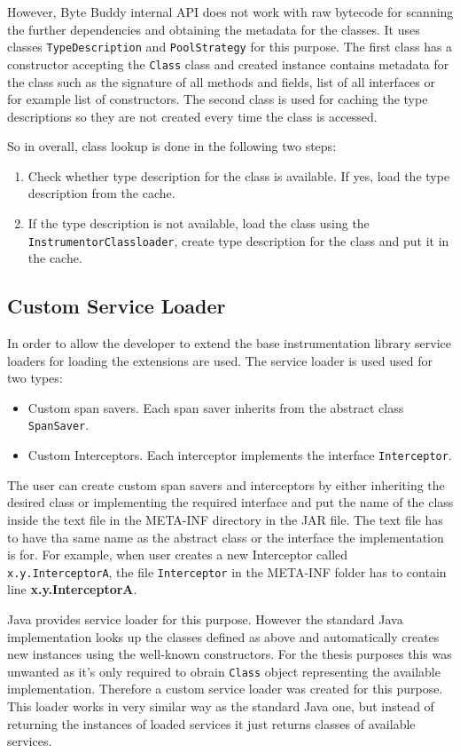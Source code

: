 However, Byte Buddy internal API does not work with raw bytecode for scanning the further dependencies and obtaining the metadata for the classes. It uses classes \texttt{TypeDescription} and \texttt{PoolStrategy} for this purpose. The first class has a constructor accepting the \texttt{Class} class and created instance contains metadata for the class such as the signature of all methods and fields, list of all interfaces or for example list of constructors. The second class is used for caching the type descriptions so they are not created every time the class is accessed. 

So in overall, class lookup is done in the following two steps:
\begin{enumerate}
	\item Check whether type description for the class is available. If yes, load the type description from the cache.
	\item If the type description is not available, load the class using the \newline \texttt{InstrumentorClassloader}, create type description for the class and put it in the cache.
\end{enumerate}

\subsection{Custom Service Loader}
In order to allow the developer to extend the base instrumentation library service loaders for loading the extensions are used. The service loader is used used for two types: 
\begin{itemize}
	\item Custom span savers. Each span saver inherits from the abstract class \texttt{SpanSaver}.
	\item Custom Interceptors. Each interceptor implements the interface \texttt{Interceptor}.
\end{itemize} 
The user can create custom span savers and interceptors by either inheriting the desired class or implementing the required interface and put the name of the class inside the text file in the META-INF directory in the JAR file. The text file has to have tha same name as the abstract class or the interface the implementation is for. For example, when user creates a new Interceptor called \texttt{x.y.InterceptorA}, the file \texttt{Interceptor} in the META-INF folder has to contain line \textbf{x.y.InterceptorA}.

Java provides service loader for this purpose. However the standard Java implementation looks up the classes defined as above and automatically creates new instances using the well-known constructors. For the thesis purposes this was unwanted as it's only required to obrain \texttt{Class} object representing the available implementation. Therefore a custom service loader was created for this purpose. This loader works in very similar way as the standard Java one, but instead of returning the instances of loaded services it just returns classes of available services. 

